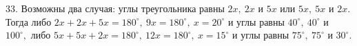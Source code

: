 33. Возможны два случая: углы треугольника равны $2x,\ 2x$ и $5x$ или $5x,\ 5x$ и $2x.$ Тогда либо $2x+2x+5x=180^\circ,\ 9x=180^\circ,\ x=20^\circ$ и углы равны
$40^\circ,\ 40^\circ$  и $100^\circ,$ либо $5x+5x+2x=180^\circ,\ 12x=180^\circ,\ x=15^\circ$ и углы равны $75^\circ,\ 75^\circ$ и $30^\circ.$\\
